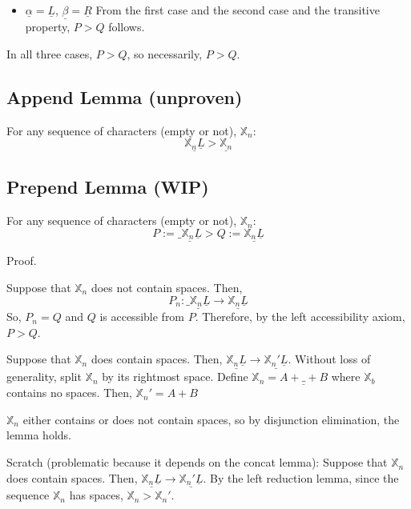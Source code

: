 \documentclass[11pt]{article}
\begin{document}
\begin{itemize}
\item \(\underline{\alpha} = \underline{L}\), \(\underline{\beta} = \underline{R}\)
From the first case and the second case and the transitive property,
\(P > Q\) follows.
\end{itemize}

In all three cases, \(P > Q\), so necessarily, \(P > Q\).

\subsection*{Append Lemma (unproven)}
\label{sec:org137b120}
For any sequence of characters (empty or not), \(\mathbb{X}_{n}\):
$$\underline{\mathbb{X}_{n} \underline{L}} > \underline{\mathbb{X}_{n}}$$

\subsection*{Prepend Lemma (WIP)}
\label{sec:org9c5a268}
For any sequence of characters (empty or not), \(\mathbb{X}_{n}\):
$$P := \underline{\_ \mathbb{X}_{n} \underline{L}} > Q := \underline{\mathbb{X}_{n} \underline{L}}$$

Proof.

\bigskip

Suppose that \(\mathbb{X}_{n}\) does not contain spaces.
Then,
$$P_{n} : \underline{\_ \mathbb{X}_{n} \underline{L}} \to \underline{\mathbb{X}_{n} \underline{L}}$$
So, \(P_{n} = Q\) and \(Q\) is accessible from \(P\).
Therefore, by the left accessibility axiom, \(P > Q\).

\bigskip

Suppose that \(\mathbb{X}_{n}\) does contain spaces.
Then, \(\underline{\mathbb{X}_{n} \underline{L}} \to \underline{\mathbb{X}_{n}' \underline{L}}\).
Without loss of generality, split \(\mathbb{X}_{n}\) by its rightmost space.
Define \(\mathbb{X}_{n} = A + \underline{\_} + B\) where \(\mathbb{X}_{b}\) contains no spaces.
Then, \(\mathbb{X}_{n}' = A + B\)

\bigskip
\(\mathbb{X}_{n}\) either contains or does not contain spaces, so by disjunction elimination, the lemma holds.

Scratch (problematic because it depends on the concat lemma):
Suppose that \(\mathbb{X}_{n}\) does contain spaces.
Then, \(\underline{\mathbb{X}_{n} \underline{L}} \to \underline{\mathbb{X}_{n}' \underline{L}}\).
By the left reduction lemma, since the sequence \(\mathbb{X}_{n}\) has spaces, \(\mathbb{X}_{n} > \mathbb{X}_{n}'\).
\end{document}
